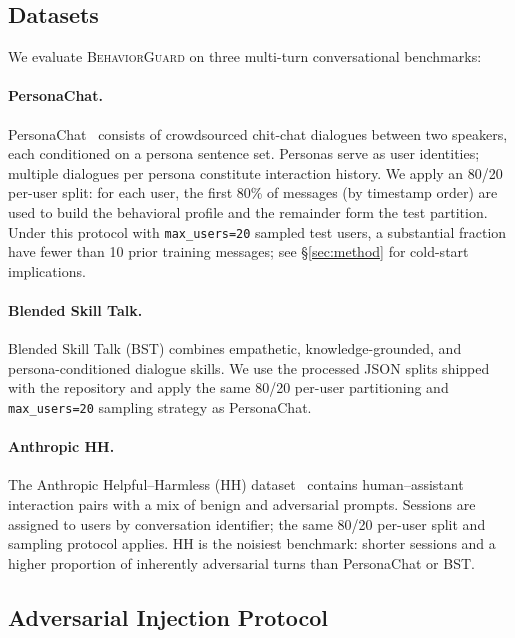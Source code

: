 \documentclass[conference]{IEEEtran}
\newcommand{\BG}{\textsc{BehaviorGuard}}
\begin{document}
\subsection{Datasets}

We evaluate \BG{} on three multi-turn conversational benchmarks:

\paragraph{PersonaChat.}
PersonaChat~\cite{zhang2018personachat} consists of crowdsourced chit-chat dialogues
between two speakers, each conditioned on a persona sentence set.
Personas serve as user identities; multiple dialogues per persona constitute interaction
history.
We apply an 80/20 per-user split: for each user, the first 80\% of messages (by
timestamp order) are used to build the behavioral profile and the remainder form the
test partition.
Under this protocol with \texttt{max\_users=20} sampled test users, a substantial
fraction have fewer than 10 prior training messages; see \S\ref{sec:method} for
cold-start implications.

\paragraph{Blended Skill Talk.}
Blended Skill Talk (BST) combines empathetic, knowledge-grounded, and
persona-conditioned dialogue skills.
We use the processed JSON splits shipped with the repository and apply the same 80/20
per-user partitioning and \texttt{max\_users=20} sampling strategy as PersonaChat.

\paragraph{Anthropic HH.}
The Anthropic Helpful--Harmless (HH) dataset~\cite{bai2022hh,aroyo2023dices} contains
human--assistant interaction pairs with a mix of benign and adversarial prompts.
Sessions are assigned to users by conversation identifier; the same 80/20 per-user split
and sampling protocol applies.
HH is the noisiest benchmark: shorter sessions and a higher proportion of inherently
adversarial turns than PersonaChat or BST.

\subsection{Adversarial Injection Protocol}
\label{sec:setup:injection}
\end{document}
